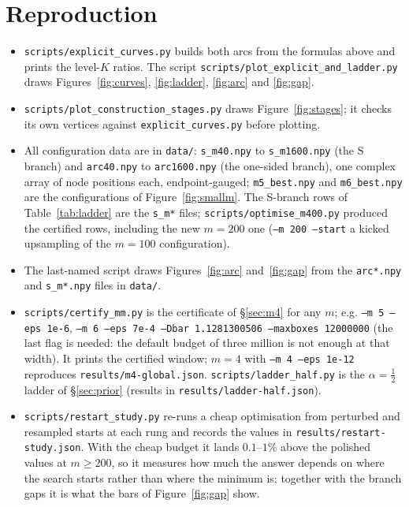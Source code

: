 \documentclass[11pt]{article}
\theoremstyle{remark}
\newcommand{\alp}{\alpha}
\begin{document}
\section*{Reproduction}
\begin{sloppypar}
\begin{itemize}
\item \texttt{scripts/explicit\_curves.py} builds both arcs from the formulas above and prints
  the level-$K$ ratios. The script
  \texttt{scripts/plot\_explicit\_and\_ladder.py} draws
  Figures~\ref{fig:curves}, \ref{fig:ladder}, \ref{fig:arc} and \ref{fig:gap}.
\item \texttt{scripts/plot\_construction\_stages.py} draws Figure~\ref{fig:stages}; it checks its
  own vertices against \texttt{explicit\_curves.py} before plotting.
\item All configuration data are in \texttt{data/}: \texttt{s\_m40.npy} to \texttt{s\_m1600.npy}
  (the S branch) and \texttt{arc40.npy} to \texttt{arc1600.npy} (the one-sided branch), one complex
  array of node positions each, endpoint-gauged; \texttt{m5\_best.npy} and \texttt{m6\_best.npy} are
  the configurations of Figure~\ref{fig:smallm}. The S-branch rows of Table~\ref{tab:ladder} are the
  \texttt{s\_m*} files;
  \texttt{scripts/optimise\_m400.py} produced the certified rows, including the new $m=200$ one
  (\texttt{--m 200 --start} a kicked upsampling of the $m=100$ configuration).
\item The last-named script draws Figures~\ref{fig:arc} and~\ref{fig:gap} from the
  \texttt{arc*.npy} and \texttt{s\_m*.npy} files in \texttt{data/}.
\item \texttt{scripts/certify\_mm.py} is the certificate of \S\ref{sec:m4} for any $m$; e.g.
  \texttt{--m 5 --eps 1e-6}, \texttt{--m 6 --eps 7e-4 --Dbar 1.1281300506 --maxboxes 12000000}
  (the last flag is needed: the default budget of three million is not enough at that width). It prints the certified
  window; $m=4$ with \texttt{--m 4 --eps 1e-12} reproduces \texttt{results/m4-global.json}. \texttt{scripts/ladder\_half.py}
  is the $\alp=\tfrac12$ ladder of \S\ref{sec:prior} (results in \texttt{results/ladder-half.json}).
\item \texttt{scripts/restart\_study.py} re-runs a cheap optimisation from perturbed and resampled
  starts at each rung and records the values in \texttt{results/restart-study.json}. With the cheap
  budget it lands $0.1$--$1\%$ above the polished values at $m\ge200$, so it measures how much the
  answer depends on where the search starts rather than where the minimum is; together with the
  branch gaps it is what the bars of Figure~\ref{fig:gap} show.
\end{itemize}
\end{sloppypar}
\end{document}
